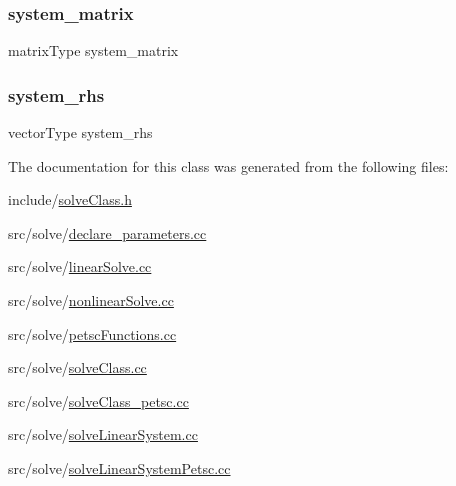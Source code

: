 \subsubsection{\texorpdfstring{system\_matrix}{system\_matrix}}
{\footnotesize\ttfamily matrix\+Type system\+\_\+matrix}

\mbox{\label{classsolve_class_a6c39fa839fdc40d2408946617a778571}} 
\subsubsection{\texorpdfstring{system\_rhs}{system\_rhs}}
{\footnotesize\ttfamily vector\+Type system\+\_\+rhs}



The documentation for this class was generated from the following files\+:\begin{DoxyCompactItemize}
\item 
include/\mbox{\hyperlink{solve_class_8h}{solve\+Class.\+h}}\item 
src/solve/\mbox{\hyperlink{solve_2declare__parameters_8cc}{declare\+\_\+parameters.\+cc}}\item 
src/solve/\mbox{\hyperlink{linear_solve_8cc}{linear\+Solve.\+cc}}\item 
src/solve/\mbox{\hyperlink{nonlinear_solve_8cc}{nonlinear\+Solve.\+cc}}\item 
src/solve/\mbox{\hyperlink{petsc_functions_8cc}{petsc\+Functions.\+cc}}\item 
src/solve/\mbox{\hyperlink{solve_class_8cc}{solve\+Class.\+cc}}\item 
src/solve/\mbox{\hyperlink{solve_class__petsc_8cc}{solve\+Class\+\_\+petsc.\+cc}}\item 
src/solve/\mbox{\hyperlink{solve_linear_system_8cc}{solve\+Linear\+System.\+cc}}\item 
src/solve/\mbox{\hyperlink{solve_linear_system_petsc_8cc}{solve\+Linear\+System\+Petsc.\+cc}}\end{DoxyCompactItemize}
